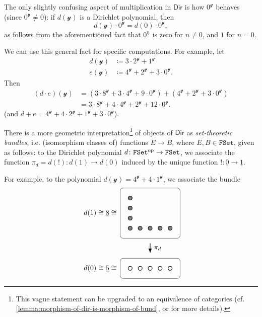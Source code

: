 \documentclass[11pt,fleqn]{article}
\newcommand{\yon}{\mathcal{y}}
\newcommand{\op}{^\textnormal{op}}
\newcommand{\cat}[1]{\mathtt{#1}}
\newcommand{\rig}[1]{\mathsf{#1}}
\newcommand{\FSet}{\cat{FSet}}
\newcommand{\Dir}{\rig{Dir}}
\begin{document}
\begin{example}
  The only slightly confusing aspect of multiplication in $\Dir$ is how $0^\yon$ behaves (since $0^\yon\neq0$):
  if $d(\yon)$ is a Dirichlet polynomial, then
  \[
    d(\yon)\cdot0^\yon = d(0)\cdot0^\yon,
  \]
  as follows from the aforementioned fact that $0^{\underline{n}}$ is zero for $n\neq0$, and $1$ for $n=0$.

  We can use this general fact for specific computations.
  For example, let
  \[
    \begin{aligned}
      d(\yon)&\coloneqq 3\cdot2^\yon+1^\yon
    \\e(\yon)&\coloneqq 4^\yon+2^\yon+3\cdot0^\yon.
    \end{aligned}
  \]
  Then
  \[
    \begin{aligned}
      (d\cdot e)(\yon)
      &= (3\cdot8^\yon + 3\cdot4^\yon + 9\cdot0^\yon) + (4^\yon + 2^\yon + 3\cdot0^\yon)
    \\&= 3\cdot8^\yon + 4\cdot4^\yon + 2^\yon + 12\cdot0^\yon.
    \end{aligned}
  \]
  (and $d+e = 4^\yon + 4\cdot2^\yon + 1^\yon + 3\cdot0^\yon$).
\end{example}

There is a more geometric interpretation\footnote{This vague statement can be upgraded to an equivalence of categories (cf. \cref{lemma:morphism-of-dir-is-morphism-of-bund}, or \cite[Theorem~4.6]{SM2020} for more details).} of objects of $\Dir$ as \emph{set-theoretic bundles}, i.e. (isomorphism classes of) functions $E\to B$, where $E,B\in\FSet$, given as follows:
to the Dirichlet polynomial $d\colon\FSet\op\to\FSet$, we associate the function $\pi_d=d(!)\colon d(1)\to d(0)$ induced by the unique function $!\colon\underline{0}\to\underline{1}$.

For example, to the polynomial $d(\yon)=4^\yon+4\cdot1^\yon$, we associate the bundle
\[
  \begin{tikzpicture}[scale=0.5]
    \node at (-2,2.5) {$d(1)\cong\underline{8}\cong$};
    \begin{scope}
      \draw[rounded corners] (0,0) rectangle ++(6,5);
      \foreach \y in {1,2,3,4}
        \draw[thick,black,fill=gray] (1,\y) circle (2mm);
      \foreach \x in {2,3,4,5}
        \draw[thick,black,fill=gray] (\x,1) circle (2mm);
    \end{scope}
    \draw[thick,-Latex] (3,-0.5) to (3,-1.5);
    \node at (3.75,-1) {$\pi_d$};
    \node at (-2,-3) {$d(0)\cong\underline{5}\cong$};
    \begin{scope}[shift={(0,-4)}]
      \draw[rounded corners] (0,0) rectangle ++(6,2);
      \foreach \x in {1,2,3,4,5}
        \draw[thick,black,fill=white] (\x,1) circle (2mm);
    \end{scope}
  \end{tikzpicture}
\]
\end{document}
